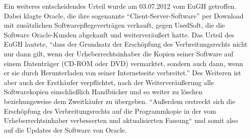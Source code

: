 Ein weiteres entscheidendes Urteil wurde am 03.07.2012 vom EuGH getroffen. Dabei klagte Oracle, die ihre sogenannte “Client-Server-Software” per Download mit zusätzlichen
Softwarepflegeverträgen verkauft, gegen UsedSoft, die die Software Oracle-Kunden abgekauft und weiterveräußert hatte. Das Urteil des EuGH lautete, “dass der Grundsatz der
Erschöpfung des Verbreitungsrechts nicht nur dann gilt, wenn der Urheberrechtsinhaber die Kopien seiner Software auf einem Datenträger (CD-ROM oder DVD) vermarktet, sondern auch dann,
wenn er sie durch Herunterladen von seiner Internetseite verbreitet.” Des Weiteren ist aber auch der Erstkäufer verpflichtet, nach der Weiterveräußerung alle Softwarekopien
einschließlich Handbücher und so weiter zu löschen beziehungsweise dem Zweitkäufer  zu übergeben. “Außerdem erstreckt sich die Erschöpfung des Verbreitungsrechts auf die
Programmkopie in der vom Urheberrechtsinhaber verbesserten und aktualisierten Fassung“ und somit also auf die Updates der Software von Oracle.
